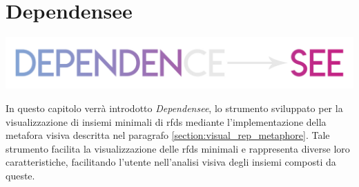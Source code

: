 \chapter{Dependensee}
\label{cap5:dependensee}
\begin{center}
    \includegraphics[width=.5\columnwidth]{capitoli/figure/logo_dependensee}
\end{center}

In questo capitolo verr\`{a} introdotto \textit{Dependensee}, lo strumento sviluppato per la visualizzazione di insiemi minimali di \acrlong{rfds} mediante l'implementazione della metafora visiva descritta nel paragrafo \ref{section:visual_rep_metaphore}. Tale strumento facilita la visualizzazione delle \acrlong{rfds} minimali e rappresenta diverse loro caratteristiche, facilitando l'utente nell'analisi visiva degli insiemi composti da queste.

